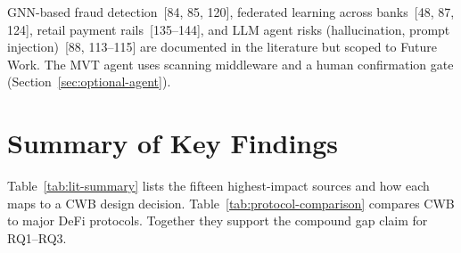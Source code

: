 \documentclass[12pt,a4paper]{report}
\begin{document}
GNN-based fraud detection~[84, 85, 120], federated learning across banks~[48, 87, 124], retail payment rails~[135--144], and LLM agent risks (hallucination, prompt injection)~[88, 113--115] are documented in the literature but scoped to Future Work. The MVT agent uses scanning middleware and a human confirmation gate (Section~\ref{sec:optional-agent}).

\section{Summary of Key Findings}
\label{sec:comparative-protocol}

Table~\ref{tab:lit-summary} lists the fifteen highest-impact sources and how each maps to a CWB design decision. Table~\ref{tab:protocol-comparison} compares CWB to major DeFi protocols. Together they support the compound gap claim for RQ1--RQ3.
\end{document}

